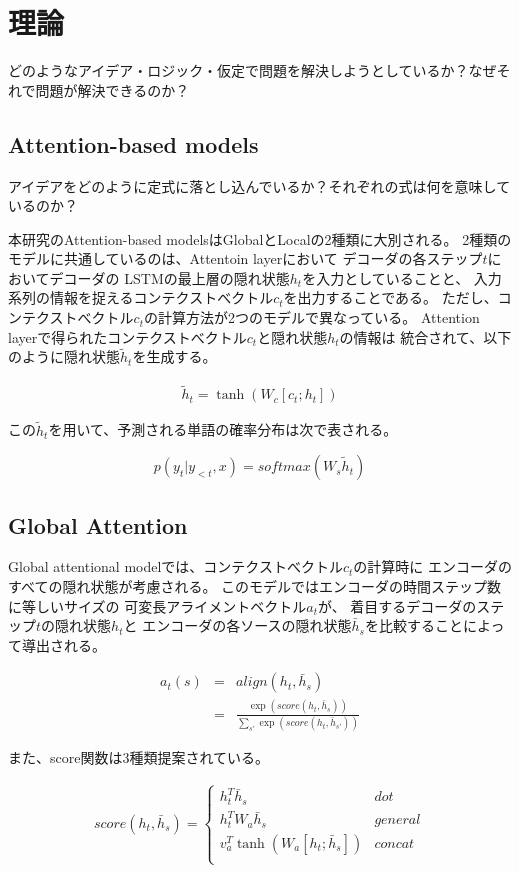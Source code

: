 \documentclass{jsarticle}
\begin{document}
\section{理論}
どのようなアイデア・ロジック・仮定で問題を解決しようとしているか？なぜそれで問題が解決できるのか？
\subsection{Attention-based models}
アイデアをどのように定式に落とし込んでいるか？それぞれの式は何を意味しているのか？

本研究のAttention-based modelsはGlobalとLocalの2種類に大別される。
2種類のモデルに共通しているのは、Attentoin layerにおいて
デコーダの各ステップ$t$においてデコーダの
LSTMの最上層の隠れ状態$h_t$を入力としていることと、
入力系列の情報を捉えるコンテクストべクトル$c_t$を出力することである。
ただし、コンテクストべクトル$c_t$の計算方法が2つのモデルで異なっている。
Attention layerで得られたコンテクストべクトル$c_t$と隠れ状態$h_t$の情報は
統合されて、以下のように隠れ状態$\tilde h_t$を生成する。

\begin{eqnarray}
  \tilde h_t = \tanh(W_c[c_t;h_t])
\end{eqnarray}

この$\tilde h_t$を用いて、予測される単語の確率分布は次で表される。

\begin{equation}
p(y_t|y_{<t},x) = softmax(W_s\tilde h_t)  
\end{equation}

\subsection{Global Attention}
Global attentional modelでは、コンテクストべクトル$c_t$の計算時に
エンコーダのすべての隠れ状態が考慮される。
このモデルではエンコーダの時間ステップ数に等しいサイズの
可変長アライメントベクトル$a_t$が、
着目するデコーダのステップ$t$の隠れ状態$h_t$と
エンコーダの各ソースの隠れ状態$\bar h_s$を比較することによって導出される。

\begin{eqnarray}
  a_t(s) &=& align(h_t,\bar h_s) \\
  &=& \frac{\exp(score(h_t,\bar h_s))}{\sum_{s'}\exp(score(h_t,\bar h_{s'}))}
\end{eqnarray}

また、score関数は3種類提案されている。

\begin{eqnarray}
  score(h_t,\bar h_s) = \begin{cases}
    h_t^T\bar h_s & dot \\
    h_t^TW_a\bar h_s & general \\
    v_a^T \tanh(W_a [h_t;\bar h_s]) & concat \\
  \end{cases}
\end{eqnarray}
\end{document}
